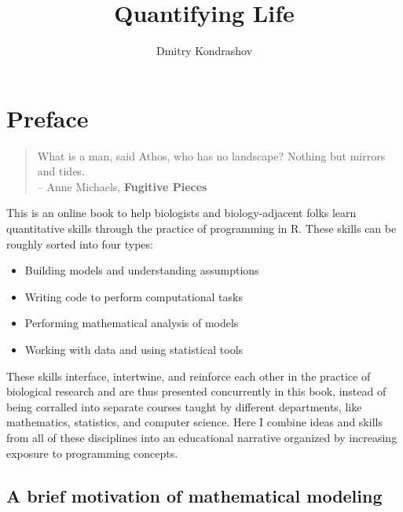 \documentclass[
  letterpaper,
  DIV=11,
  numbers=noendperiod]{scrreprt}
\title{Quantifying Life}
\author{Dmitry Kondrashov}
\date{}
\renewcommand*\contentsname{Table of contents}
\newcommand\contentsname{Table of contents}
\begin{document}
\maketitle
\ifdefined\Shaded\renewenvironment{Shaded}{\begin{tcolorbox}[interior hidden, boxrule=0pt, sharp corners, frame hidden, breakable, borderline west={3pt}{0pt}{shadecolor}, enhanced]}{\end{tcolorbox}}\fi

\renewcommand*\contentsname{Table of contents}
{
\hypersetup{linkcolor=}
\setcounter{tocdepth}{2}
\tableofcontents
}

\hypertarget{preface}{%
\chapter*{Preface}\label{preface}}


\begin{quote}
What is a man, said Athos, who has no landscape? Nothing but mirrors and
tides.\\
-- Anne Michaels, \textbf{Fugitive Pieces}
\end{quote}

This is an online book to help biologists and biology-adjacent folks
learn quantitative skills through the practice of programming in R.
These skills can be roughly sorted into four types:

\begin{itemize}
\item
  Building models and understanding assumptions
\item
  Writing code to perform computational tasks
\item
  Performing mathematical analysis of models
\item
  Working with data and using statistical tools
\end{itemize}

These skills interface, intertwine, and reinforce each other in the
practice of biological research and are thus presented concurrently in
this book, instead of being corralled into separate courses taught by
different departments, like mathematics, statistics, and computer
science. Here I combine ideas and skills from all of these disciplines
into an educational narrative organized by increasing exposure to
programming concepts.

\hypertarget{a-brief-motivation-of-mathematical-modeling}{%
\section*{A brief motivation of mathematical
modeling}\label{a-brief-motivation-of-mathematical-modeling}}
\end{document}
